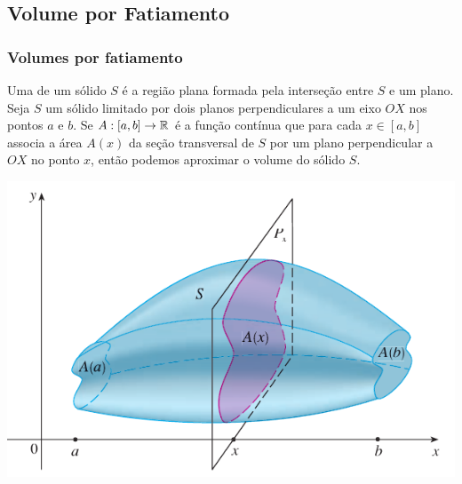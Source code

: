 

\subsection*{Volume por Fatiamento}
\begin{frame}
\frametitle{Volumes por fatiamento}


Uma  de um sólido $S$ é a região plana formada pela interseção entre $S$ e um plano. Seja $S$ um sólido limitado por dois planos perpendiculares a um eixo $OX$ nos pontos $a$ e $b$. Se $A:[a,b]\to \mathbb{R}$ é a função contínua que para cada $x\in[a,b]$ associa a área $A(x)$ da seção transversal de $S$ por um plano perpendicular a $OX$ no ponto $x$, então podemos aproximar o volume do sólido $S$. 

\begin{center}
\includegraphics[scale=0.4]{volume-fatia.png}
\end{center}




\end{frame}



